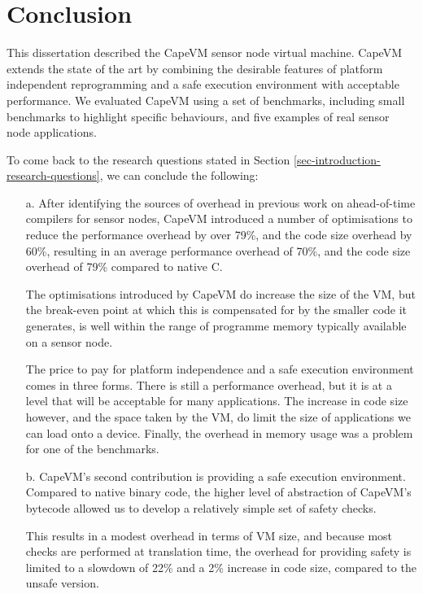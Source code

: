 \chapter{Conclusion}
This dissertation described the CapeVM sensor node virtual machine. CapeVM extends the state of the art by combining the desirable features of platform independent reprogramming and a safe execution environment with acceptable performance. We evaluated CapeVM using a set of benchmarks, including small benchmarks to highlight specific behaviours, and five examples of real sensor node applications.

To come back to the research questions stated in Section \ref{sec-introduction-research-questions}, we can conclude the following:

\begin{enumerate}
	\item[a.]
	After identifying the sources of overhead in previous work on ahead-of-time compilers for sensor nodes, CapeVM introduced a number of optimisations to reduce the performance overhead by over 79\%, and the code size overhead by 60\%, resulting in an average performance overhead of 70\%, and the code size overhead of 79\% compared to native C.

	The optimisations introduced by CapeVM do increase the size of the VM, but the break-even point at which this is compensated for by the smaller code it generates, is well within the range of programme memory typically available on a sensor node.

	The price to pay for platform independence and a safe execution environment comes in three forms. There is still a performance overhead, but it is at a level that will be acceptable for many applications. The increase in code size however, and the space taken by the VM, do limit the size of applications we can load onto a device. Finally, the overhead in memory usage was a problem for one of the benchmarks.

	\item[b.]
	CapeVM's second contribution is providing a safe execution environment. Compared to native binary code, the higher level of abstraction of CapeVM's bytecode allowed us to develop a relatively simple set of safety checks.
	
	This results in a modest overhead in terms of VM size, and because most checks are performed at translation time, the overhead for providing safety is limited to a slowdown of 22\% and a 2\% increase in code size, compared to the unsafe version.
	

\end{enumerate}

